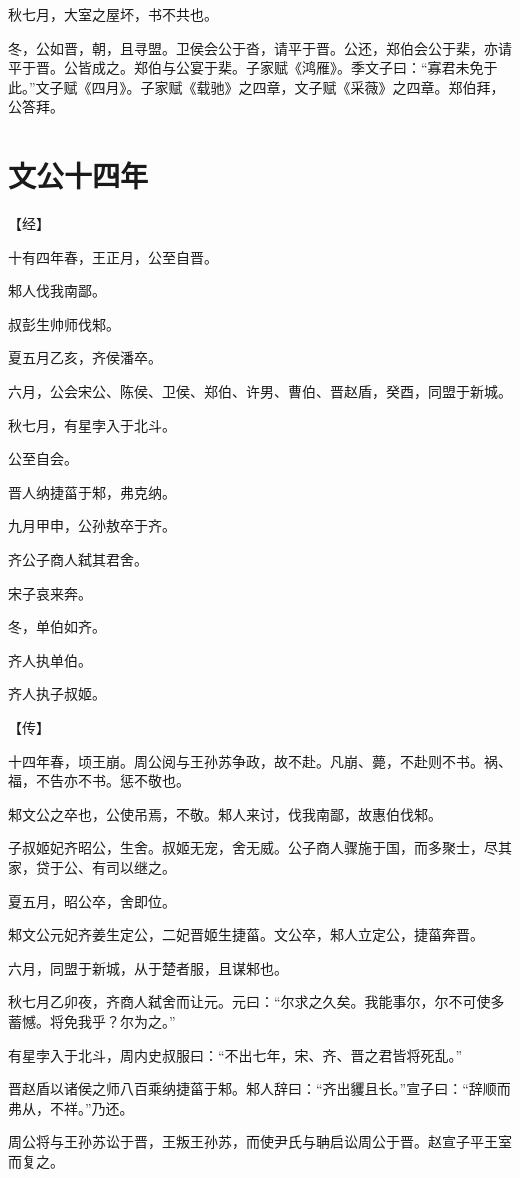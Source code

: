 \documentclass[a4paper,12pt,UTF8,twoside]{ctexbook}
\begin{document}
秋七月，大室之屋坏，书不共也。

冬，公如晋，朝，且寻盟。卫侯会公于沓，请平于晋。公还，郑伯会公于棐，亦请平于晋。公皆成之。郑伯与公宴于棐。子家赋《鸿雁》。季文子曰：“寡君未免于此。”文子赋《四月》。子家赋《载驰》之四章，文子赋《采薇》之四章。郑伯拜，公答拜。


\section{文公十四年}


【经】

十有四年春，王正月，公至自晋。

邾人伐我南鄙。

叔彭生帅师伐邾。

夏五月乙亥，齐侯潘卒。

六月，公会宋公、陈侯、卫侯、郑伯、许男、曹伯、晋赵盾，癸酉，同盟于新城。

秋七月，有星孛入于北斗。

公至自会。

晋人纳捷菑于邾，弗克纳。

九月甲申，公孙敖卒于齐。

齐公子商人弑其君舍。

宋子哀来奔。

冬，单伯如齐。

齐人执单伯。

齐人执子叔姬。

【传】

十四年春，顷王崩。周公阅与王孙苏争政，故不赴。凡崩、薨，不赴则不书。祸、福，不告亦不书。惩不敬也。

邾文公之卒也，公使吊焉，不敬。邾人来讨，伐我南鄙，故惠伯伐邾。

子叔姬妃齐昭公，生舍。叔姬无宠，舍无威。公子商人骤施于国，而多聚士，尽其家，贷于公、有司以继之。

夏五月，昭公卒，舍即位。

邾文公元妃齐姜生定公，二妃晋姬生捷菑。文公卒，邾人立定公，捷菑奔晋。

六月，同盟于新城，从于楚者服，且谋邾也。

秋七月乙卯夜，齐商人弑舍而让元。元曰：“尔求之久矣。我能事尔，尔不可使多蓄憾。将免我乎？尔为之。”

有星孛入于北斗，周内史叔服曰：“不出七年，宋、齐、晋之君皆将死乱。”

晋赵盾以诸侯之师八百乘纳捷菑于邾。邾人辞曰：“齐出貜且长。”宣子曰：“辞顺而弗从，不祥。”乃还。

周公将与王孙苏讼于晋，王叛王孙苏，而使尹氏与聃启讼周公于晋。赵宣子平王室而复之。
\end{document}
